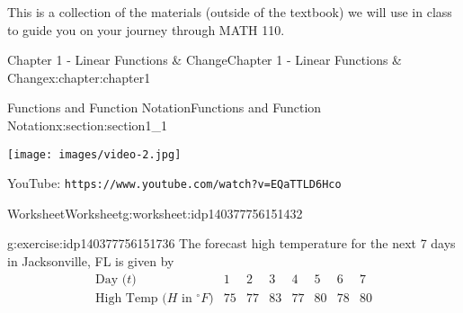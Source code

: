 \documentclass[oneside,10pt,]{book}
\newcommand{\mono}[1]{\texttt{#1}}
\newlength{\qrsize}
\newlength{\previewwidth}
\begin{document}
\mainmatter
This is a collection of the materials (outside of the textbook) we will use in class to guide you on your journey through MATH 110.%
%
%
\typeout{************************************************}
\typeout{************************************************}
%
\begin{chapterptx}{Chapter 1 - Linear Functions \& Change}{}{Chapter 1 - Linear Functions \& Change}{}{}{x:chapter:chapter1}
%
%
\typeout{************************************************}
\typeout{************************************************}
%
\begin{sectionptx}{Functions and Function Notation}{}{Functions and Function Notation}{}{}{x:section:section1_1}
\setlength{\qrsize}{9em}
\setlength{\previewwidth}{\linewidth}
\addtolength{\previewwidth}{-\qrsize}
\begin{tcbraster}[raster columns=2, raster column skip=1pt, raster halign=center, raster force size=false, raster left skip=0pt, raster right skip=0pt]%
\begin{tcolorbox}[previewstyle, width=\previewwidth]%
\texttt{[image: images/video-2.jpg]}%
\end{tcolorbox}%
\begin{tcolorbox}[qrstyle]%
{\hypersetup{urlcolor=black}}%
\end{tcolorbox}%
\begin{tcolorbox}[captionstyle]%
\small YouTube: \mono{https://www.youtube.com/watch?v=EQaTTLD6Hco}\end{tcolorbox}%
\end{tcbraster}%
%
%
\typeout{************************************************}
\typeout{************************************************}
%
\begin{worksheet-subsection}{Worksheet}{}{Worksheet}{}{}{g:worksheet:idp140377756151432}
\begin{divisionexercise}{1}{}{}{g:exercise:idp140377756151736}%
The forecast high temperature for the next 7 days in Jacksonville, FL is given by%
\begin{equation*}
\begin{array}{l|c|c|c|c|c|c|c}
\text{Day ($t$)} & 1 & 2 & 3 & 4 & 5 & 6 & 7 \\
\hline \text{High Temp ($H$ in $^{\circ}F$)} & 75 & 77 & 83 & 77 & 80 & 78 & 80

\end{array}
\end{equation*}
\end{divisionexercise}
\end{worksheet-subsection}
\end{sectionptx}
\end{chapterptx}
\end{document}
